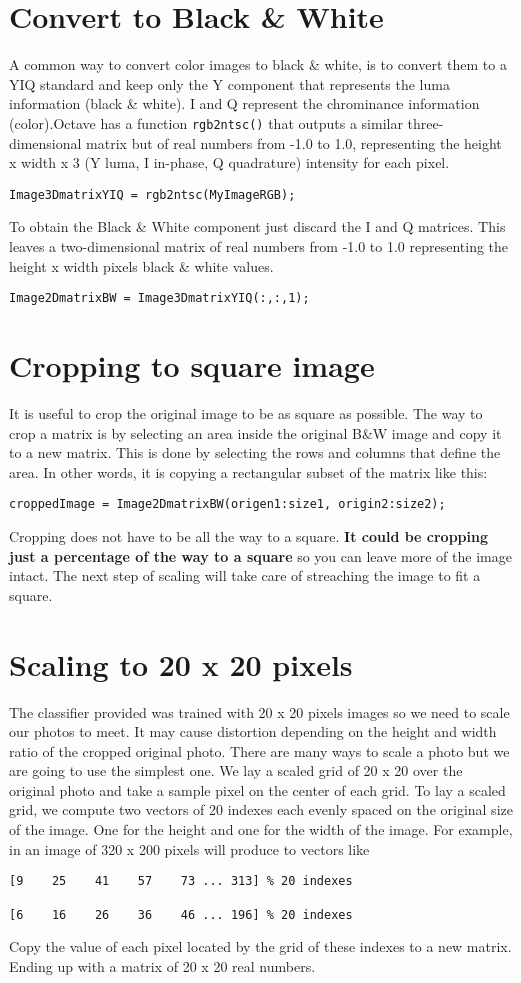\section{Convert to Black \& White}
A common way to convert color images to black \& white, is to convert them to a YIQ standard and keep only the Y component that represents the luma information (black \& white). I and Q represent the chrominance information (color).Octave has a function \verb|rgb2ntsc()| that outputs a similar three-dimensional matrix but of real numbers from -1.0 to 1.0, representing the height x width x 3 (Y luma, I in-phase, Q quadrature) intensity for each pixel.
\begin{verbatim}
Image3DmatrixYIQ = rgb2ntsc(MyImageRGB);
\end{verbatim}
To obtain the Black \& White component just discard the I and Q matrices. This leaves a two-dimensional matrix of real numbers from -1.0 to 1.0 representing the height x width pixels black \& white values.
\begin{verbatim}
Image2DmatrixBW = Image3DmatrixYIQ(:,:,1);
\end{verbatim}
\section{Cropping to square image}
It is useful to crop the original image to be as square as possible. The way to crop a matrix is by selecting an area inside the original B\&W image and copy it to a new matrix. This is done by selecting the rows and columns that define the area. In other words, it is copying a rectangular subset of the matrix like this:
\begin{verbatim}
croppedImage = Image2DmatrixBW(origen1:size1, origin2:size2);
\end{verbatim}
Cropping does not have to be all the way to a square. \textbf{It could be cropping just a percentage of the way to a square} so you can leave more of the image intact. The next step of scaling will take care of streaching the image to fit a square.
\section{Scaling to 20 x 20 pixels}
The classifier provided was trained with 20 x 20 pixels images so we need to scale our photos to meet. It may cause distortion depending on the height and width ratio of the cropped original photo. There are many ways to scale a photo but we are going to use the simplest one. We lay a scaled grid of 20 x 20 over the original photo and take a sample pixel on the center of each grid. To lay a scaled grid, we compute two vectors of 20 indexes each evenly spaced on the original size of the image. One for the height and one for the width of the image. For example, in an image of 320 x 200 pixels will produce to vectors like
\begin{verbatim}
[9    25    41    57    73 ... 313] % 20 indexes

[6    16    26    36    46 ... 196] % 20 indexes
\end{verbatim}
Copy the value of each pixel located by the grid of these indexes to a new matrix. Ending up with a matrix of 20 x 20 real numbers.
